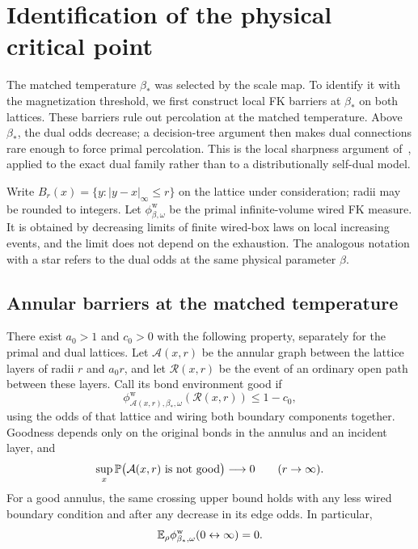 \section{Identification of the physical critical point}
\label{sec:criticality}

The matched temperature $\beta_*$ was selected by the scale map. To
identify it with the magnetization threshold, we first construct local
FK barriers at $\beta_*$ on both lattices. These barriers rule out
percolation at the matched temperature. Above $\beta_*$, the dual odds
decrease; a decision-tree argument then makes dual connections rare
enough to force primal percolation. This is the local sharpness
argument of~\cite[Section~8]{R}, applied to the exact dual family
rather than to a distributionally self-dual model.

Write $B_r(x)=\{y:|y-x|_\infty\le r\}$ on the lattice under
consideration; radii may be rounded to integers. Let
$\phi_{\beta,\omega}^{\mathrm w}$ be the primal infinite-volume
wired FK measure. It is obtained by decreasing limits of finite
wired-box laws on local increasing events, and the limit does not
depend on the exhaustion. The analogous notation with a star refers
to the dual odds at the same physical parameter $\beta$.

\subsection{Annular barriers at the matched temperature}

\begin{lemma}
\label{lem:fk-barriers}
There exist $a_0>1$ and $c_0>0$ with the following property, separately
for the primal and dual lattices. Let $\mathcal A(x,r)$ be the annular
graph between the lattice layers of radii $r$ and $a_0r$, and let
$\mathcal R(x,r)$ be the event of an ordinary open path between
these layers. Call its bond environment good if
\begin{equation}
 \phi_{\mathcal A(x,r),\beta_*,\omega}^{\mathrm w}
        (\mathcal R(x,r))\le1-c_0,
 \label{eq:good-annulus}
\end{equation}
using the odds of that lattice and wiring both boundary components
together. Goodness depends only on the original bonds in the annulus
and an incident layer, and
\begin{equation}
 \sup_x\mathbb P\bigl(\mathcal A(x,r)\text{ is not good}\bigr)
                         \longrightarrow0\qquad(r\to\infty).
 \label{eq:annulus-good-probability}
\end{equation}
For a good annulus, the same crossing upper bound holds with any
less wired boundary condition and after any decrease in its edge odds.
In particular,
\begin{equation}
       \mathbb E_\rho\phi_{\beta_*,\omega}^{\mathrm w}
                      (0\leftrightarrow\infty)=0.
 \label{eq:no-percolation-at-matching}
\end{equation}
\end{lemma}

